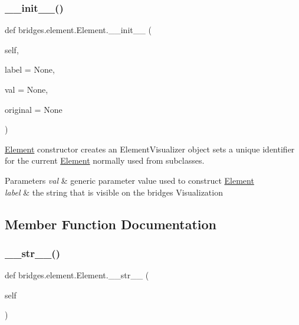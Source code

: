 \subsubsection{\texorpdfstring{\+\_\+\+\_\+init\+\_\+\+\_\+()}{\_\_init\_\_()}}
{\footnotesize\ttfamily def bridges.\+element.\+Element.\+\_\+\+\_\+init\+\_\+\+\_\+ (\begin{DoxyParamCaption}\item[{}]{self,  }\item[{}]{label = {\ttfamily None},  }\item[{}]{val = {\ttfamily None},  }\item[{}]{original = {\ttfamily None} }\end{DoxyParamCaption})}



\mbox{\hyperlink{classbridges_1_1element_1_1_element}{Element}} constructor creates an Element\+Visualizer object sets a unique identifier for the current \mbox{\hyperlink{classbridges_1_1element_1_1_element}{Element}} normally used from subclasses. 


\begin{DoxyParams}{Parameters}
{\em val} & generic parameter value used to construct \mbox{\hyperlink{classbridges_1_1element_1_1_element}{Element}} \\
\hline
{\em label} & the string that is visible on the bridges Visualization \\
\hline
\end{DoxyParams}


\subsection{Member Function Documentation}
\mbox{\label{classbridges_1_1element_1_1_element_a92a94c7f36d8cfb5db5435013556519a}} 
\subsubsection{\texorpdfstring{\+\_\+\+\_\+str\+\_\+\+\_\+()}{\_\_str\_\_()}}
{\footnotesize\ttfamily def bridges.\+element.\+Element.\+\_\+\+\_\+str\+\_\+\+\_\+ (\begin{DoxyParamCaption}\item[{}]{self }\end{DoxyParamCaption})}

